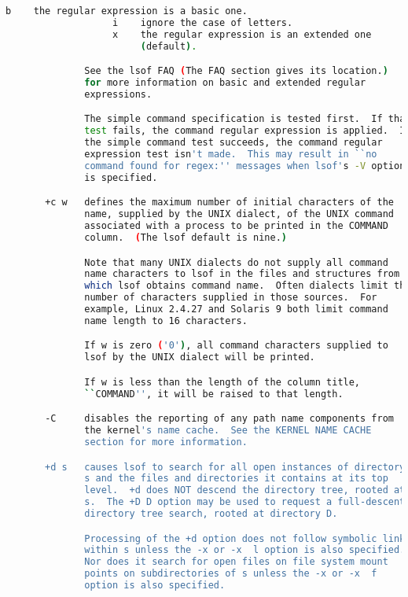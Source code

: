 {{\begin{lstlisting}[language=bash]
                   b    the regular expression is a basic one.
                   i    ignore the case of letters.
                   x    the regular expression is an extended one
                        (default).

              See the lsof FAQ (The FAQ section gives its location.)
              for more information on basic and extended regular
              expressions.

              The simple command specification is tested first.  If that
              test fails, the command regular expression is applied.  If
              the simple command test succeeds, the command regular
              expression test isn't made.  This may result in ``no
              command found for regex:'' messages when lsof's -V option
              is specified.

       +c w   defines the maximum number of initial characters of the
              name, supplied by the UNIX dialect, of the UNIX command
              associated with a process to be printed in the COMMAND
              column.  (The lsof default is nine.)

              Note that many UNIX dialects do not supply all command
              name characters to lsof in the files and structures from
              which lsof obtains command name.  Often dialects limit the
              number of characters supplied in those sources.  For
              example, Linux 2.4.27 and Solaris 9 both limit command
              name length to 16 characters.

              If w is zero ('0'), all command characters supplied to
              lsof by the UNIX dialect will be printed.

              If w is less than the length of the column title,
              ``COMMAND'', it will be raised to that length.

       -C     disables the reporting of any path name components from
              the kernel's name cache.  See the KERNEL NAME CACHE
              section for more information.

       +d s   causes lsof to search for all open instances of directory
              s and the files and directories it contains at its top
              level.  +d does NOT descend the directory tree, rooted at
              s.  The +D D option may be used to request a full-descent
              directory tree search, rooted at directory D.

              Processing of the +d option does not follow symbolic links
              within s unless the -x or -x  l option is also specified.
              Nor does it search for open files on file system mount
              points on subdirectories of s unless the -x or -x  f
              option is also specified.


\end{lstlisting}}}
